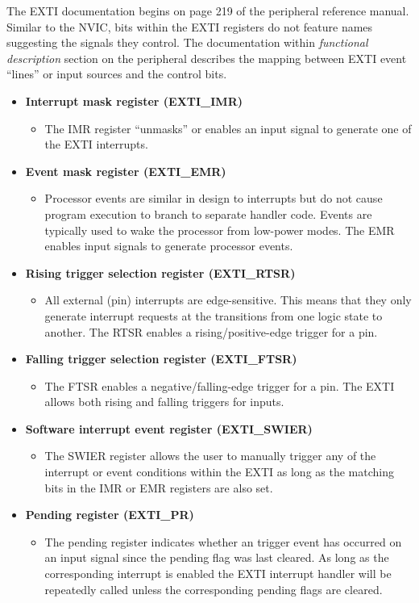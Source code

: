 \documentclass[11pt,fleqn]{book} %
\begin{document}
The EXTI documentation begins on page 219 of the peripheral reference manual. Similar to the NVIC, bits within the EXTI registers do not feature names suggesting the signals they control. The documentation within \textit{functional description} section on the peripheral describes the mapping between EXTI event ``lines'' or input sources and the control bits. 


\begin{itemize}
    \item \textbf{Interrupt mask register (EXTI\_IMR)}
    \begin{itemize}
        \item The IMR register ``unmasks'' or enables an input signal to generate one of the EXTI interrupts.
    \end{itemize}
    \item \textbf{Event mask register (EXTI\_EMR)}
    \begin{itemize}
        \item Processor events are similar in design to interrupts but do not cause program execution to branch to separate handler code. Events are typically used to wake the processor from low-power modes. The EMR enables input signals to generate processor events. 
    \end{itemize}
    \item \textbf{Rising trigger selection register (EXTI\_RTSR)}
    \begin{itemize}
        \item All external (pin) interrupts are edge-sensitive. This means that they only generate interrupt requests at the transitions from one logic state to another. The RTSR enables a rising/positive-edge trigger for a pin.
    \end{itemize}
    \item \textbf{Falling trigger selection register (EXTI\_FTSR)}
    \begin{itemize}
        \item The FTSR enables a negative/falling-edge trigger for a pin. The EXTI allows both rising and falling triggers for inputs.  
    \end{itemize}
    \item \textbf{Software interrupt event register (EXTI\_SWIER)}
    \begin{itemize}
        \item The SWIER register allows the user to manually trigger any of the interrupt or event conditions within the EXTI as long as the matching bits in the IMR or EMR registers are also set. 
    \end{itemize}
    \item \textbf{Pending register (EXTI\_PR)}
    \begin{itemize}
        \item  The pending register indicates whether an trigger event has occurred on an input signal since the pending flag was last cleared. As long as the corresponding interrupt is enabled the EXTI interrupt handler will be repeatedly called unless the corresponding pending flags are cleared. 
    \end{itemize}
\end{itemize}
\end{document}
